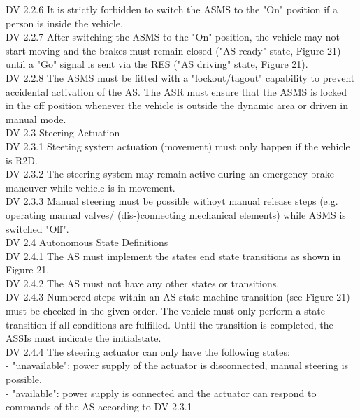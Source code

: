 \documentclass{article}
\begin{document}
DV 2.2.6 It is strictly forbidden to switch the ASMS to the "On" position if a person is inside the vehicle.\\

DV 2.2.7 After switching the ASMS to the "On" position, the vehicle may not start moving and the brakes must remain closed ("AS ready" state, Figure 21) until a "Go" signal is sent via the RES ("AS driving" state, Figure 21).\\

DV 2.2.8 The ASMS must be fitted with a "lockout/tagout" capability to prevent accidental activation of the AS. The ASR must ensure that the ASMS is locked in the off position whenever the vehicle is outside the dynamic area or driven in manual mode.\\

DV 2.3 Steering Actuation\\

DV 2.3.1 Steeting system actuation (movement) must only happen if the vehicle is R2D.\\

DV 2.3.2 The steering system may remain active during an emergency brake maneuver while vehicle is in movement.\\

DV 2.3.3 Manual steering must be possible withoyt manual release steps (e.g. operating manual valves/ (dis-)connecting mechanical elements) while ASMS is switched "Off".\\

DV 2.4 Autonomous State Definitions\\

DV 2.4.1 The AS must implement the states end state transitions as shown in Figure 21.\\

DV 2.4.2 The AS must not have any other states or transitions.\\

DV 2.4.3 Numbered steps within an AS state machine transition (see Figure 21) must be checked in the given order. The vehicle must only perform a state-transition if all conditions are fulfilled. Until the transition is completed, the ASSIs must indicate the initialstate.\\

DV 2.4.4 The steering actuator can only have the following states:\\
	- "unavailable": power supply of the actuator is disconnected, manual steering is possible.\\
	- "available": power supply is connected and the actuator can respond to commands of the AS according to DV 2.3.1\\
\end{document}
